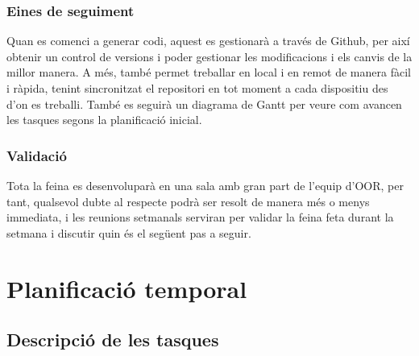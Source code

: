 \documentclass[11pt]{article}
\begin{document}
\subsubsection{Eines de seguiment}
Quan es comenci a generar codi, aquest es gestionarà a través de Github, per així obtenir un control de versions i poder gestionar les modificacions i els canvis de la millor manera. A més, també permet treballar en local i en remot de manera fàcil i ràpida, tenint sincronitzat el repositori en tot moment a cada dispositiu des d’on es treballi.
També es seguirà un diagrama de Gantt per veure com avancen les tasques segons la planificació inicial.
\subsubsection{Validació}
Tota la feina es desenvoluparà en una sala amb gran part de l’equip d’OOR, per tant, qualsevol dubte al respecte podrà ser resolt de manera més o menys immediata, i les reunions setmanals serviran per validar la feina feta durant la setmana i discutir quin és el següent pas a seguir.


\section{Planificació temporal}
\subsection{Descripció de les tasques}
\end{document}
